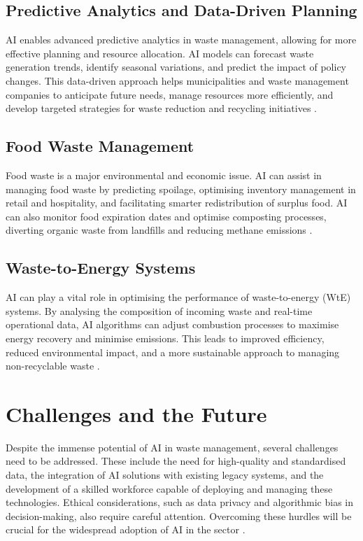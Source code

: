 \subsection{Predictive Analytics and Data-Driven Planning}

AI enables advanced predictive analytics in waste management, allowing for more effective planning and resource allocation. AI models can forecast waste generation trends, identify seasonal variations, and predict the impact of policy changes. This data-driven approach helps municipalities and waste management companies to anticipate future needs, manage resources more efficiently, and develop targeted strategies for waste reduction and recycling initiatives \parencite{kordana2023artificial}.

\subsection{Food Waste Management}

Food waste is a major environmental and economic issue. AI can assist in managing food waste by predicting spoilage, optimising inventory management in retail and hospitality, and facilitating smarter redistribution of surplus food. AI can also monitor food expiration dates and optimise composting processes, diverting organic waste from landfills and reducing methane emissions \parencite{sharma2023wastemanagement}.

\subsection{Waste-to-Energy Systems}

AI can play a vital role in optimising the performance of waste-to-energy (WtE) systems. By analysing the composition of incoming waste and real-time operational data, AI algorithms can adjust combustion processes to maximise energy recovery and minimise emissions. This leads to improved efficiency, reduced environmental impact, and a more sustainable approach to managing non-recyclable waste \parencite{fang2023artificial}.

\section{Challenges and the Future}

Despite the immense potential of AI in waste management, several challenges need to be addressed. These include the need for high-quality and standardised data, the integration of AI solutions with existing legacy systems, and the development of a skilled workforce capable of deploying and managing these technologies. Ethical considerations, such as data privacy and algorithmic bias in decision-making, also require careful attention. Overcoming these hurdles will be crucial for the widespread adoption of AI in the sector \parencite{kordana2023artificial}.

